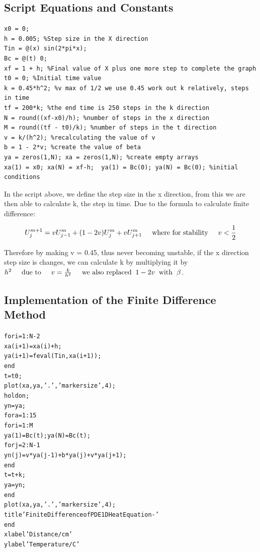 \documentclass[11pt,a4paper]{article}
\begin{document}
\subsection{Script Equations and Constants}

\begin{verbatim}
x0 = 0;
h = 0.005; %Step size in the X direction
Tin = @(x) sin(2*pi*x);
Bc = @(t) 0;
xf = 1 + h; %Final value of X plus one more step to complete the graph
t0 = 0; %Initial time value
k = 0.45*h^2; %v max of 1/2 we use 0.45 work out k relatively, steps in time
tf = 200*k; %the end time is 250 steps in the k direction
N = round((xf-x0)/h); %number of steps in the x direction
M = round((tf - t0)/k); %number of steps in the t direction
v = k/(h^2); %recalculating the value of v
b = 1 - 2*v; %create the value of beta
ya = zeros(1,N); xa = zeros(1,N); %create empty arrays
xa(1) = x0; xa(N) = xf-h;  ya(1) = Bc(0); ya(N) = Bc(0); %initial conditions
\end{verbatim}

In the script above, we define the step size in the x direction, from this we are then able to calculate k, the step in time. Due to the formula to calculate finite difference:

\[U^{m+1}_j = vU^m_{j-1} +(1-2v)U^m_{j}+vU^m_{j+1} \hspace{5mm} \text{where for stability} \hspace{5mm} v < \frac{1}{2}\]

Therefore by making v = 0.45, thus never becoming unstable, if the x direction step size is changes, we can calculate k by multiplying it by $h^2 \hspace{5mm} \text{due to} \hspace{5mm} v = \frac{k}{h^2} \hspace{5mm} \text{we also replaced} \hspace{2mm} 1-2v \hspace{2mm} \text{with} \hspace{2mm} \beta $.

\subsection{Implementation of the Finite Difference Method}

\begin{alltt}
for i = 1:N-2
    xa(i+1) = xa(i) + h; %
    ya(i+1) = feval(Tin, xa(i+1)); %
end
t = t0; %
plot(xa, ya, '.', 'markersize', 4); %
hold on; %
yn = ya; %
for a = 1:15 %
    for i = 1:M %
        ya(1) = Bc(t); ya(N) = Bc(t); %
	       for j = 2:N-1 %
           yn(j) = v*ya(j-1) + b*ya(j) + v*ya(j+1);
	       end
        t = t+k; %
        ya = yn; %
    end
    plot(xa, ya, '.', 'markersize', 4); %
    title 'Finite Difference of PDE 1D Heat Equation - '
end
xlabel 'Distance/cm'
ylabel 'Temperature/C'
\end{alltt}
\end{document}
